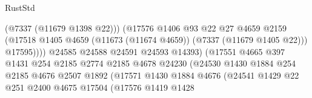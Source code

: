 \begin{lexlean}{RustStd}
\begin{coremodule}
                                                (@7337 (@11679 @1398 @22)))
                                              (@17576
                                                @1406
                                                @93
                                                @22
                                                @27
                                                @4659
                                                @2159
                                                (@17518
                                                  @1405
                                                  @4659
                                                  (@11673 (@11674 @4659))
                                                  (@7337 (@11679 @1405 @22)))
                                                @17595))))
                                        @24585
                                        @24588
                                        @24591
                                        @24593
                                        @14393)
                                      (@17551
                                        @4665
                                        @397
                                        @1431
                                        @254
                                        @2185
                                        @2774
                                        @2185
                                        @4678
                                        @24230
                                        (@24530
                                          @1430
                                          @1884
                                          @254
                                          @2185
                                          @4676
                                          @2507
                                          @1892
                                          (@17571
                                            @1430
                                            @1884
                                            @4676
                                            (@24541
                                              @1429
                                              @22
                                              @251
                                              @2400
                                              @4675
                                              @17504
                                              (@17576
                                                @1419
                                                @1428

\end{coremodule}
\end{lexlean}
